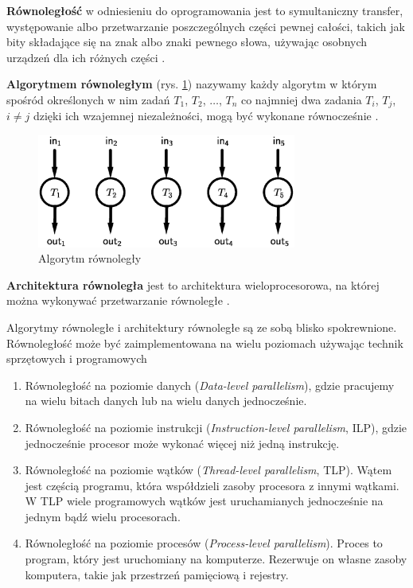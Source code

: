 \begin{definicja}[Równoległość]\label{def:rownoleglosc}
\textbf{Równoległość} w odniesieniu do oprogramowania jest to symultaniczny transfer, występowanie albo przetwarzanie poszczególnych części pewnej całości, takich jak bity składające się na znak albo znaki pewnego słowa, używając osobnych urządzeń dla ich różnych części \cite{IEEE}.
\end{definicja}

\begin{definicja}\label{def:algorytm_rownolegly}
\textbf{Algorytmem równoległym} (rys.  \ref{fig:parallel}) nazywamy każdy algorytm w którym spośród określonych w nim zadań \(T_1\), \(T_2\), \(\dots\), \(T_n\) co najmniej dwa zadania \(T_i\), \(T_j\), \(i\neq j\) dzięki ich wzajemnej niezależności, mogą być wykonane równocześnie \cite{APC2011}.\\
\end{definicja}

\begin{figure}[h]
\centering
\includegraphics[width=23em]{./images/Rys1.eps}
\caption{Algorytm równoległy}
\label{fig:parallel}
\end{figure}

\begin{definicja}\label{def:arch_rownolegla}
\textbf{Architektura równoległa} jest to architektura wieloprocesorowa, na której można wykonywać przetwarzanie równoległe \cite{IEEE}.
\end{definicja}

Algorytmy równoległe i architektury równoległe są ze sobą blisko spokrewnione. Równoległość może być zaimplementowana na wielu poziomach używając technik sprzętowych i programowych\cite{APC2011}
\begin{enumerate}
\item{Równoległość na poziomie danych (\emph{Data-level parallelism}), gdzie pracujemy na wielu bitach danych lub na wielu danych jednocześnie.}
\item{Równoległość na poziomie instrukcji (\emph{Instruction-level parallelism}, ILP), gdzie jednocześnie procesor może wykonać więcej niż jedną instrukcję.}
\item{Równoległość na poziomie wątków (\emph{Thread-level parallelism}, TLP). Wątem jest częścią programu, która współdzieli zasoby procesora z innymi wątkami. W TLP wiele programowych wątków jest uruchamianych jednocześnie na jednym bądź wielu procesorach.}
\item{Równoległość na poziomie procesów (\emph{Process-level parallelism}). Proces to program, który jest uruchomiany na komputerze. Rezerwuje on własne zasoby komputera, takie jak przestrzeń pamięciową i rejestry.}
\end{enumerate}

